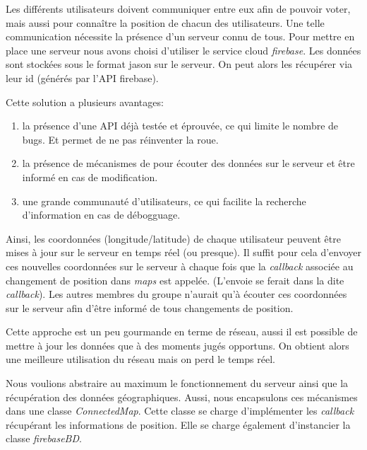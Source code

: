 Les différents utilisateurs doivent communiquer entre eux afin de pouvoir voter, mais aussi pour connaître la position de chacun
des utilisateurs. Une telle communication nécessite la présence d'un serveur connu de tous. Pour mettre en place une serveur nous
avons choisi d'utiliser le service cloud \textit{firebase}. Les données sont stockées sous le format jason sur le serveur. On peut
alors les récupérer via leur id (générés par l'API firebase).
\newline

Cette solution a plusieurs avantages:
\begin{enumerate}
    \item la présence d'une API déjà testée et éprouvée, ce qui limite le nombre de bugs. Et permet de ne pas réinventer la roue.
    \item la présence de mécanismes de pour écouter des données sur le serveur et être informé en cas de modification.
    \item une grande communauté d'utilisateurs, ce qui facilite la recherche d'information en cas de débogguage.
\end{enumerate}

Ainsi, les coordonnées (longitude/latitude) de chaque utilisateur peuvent être mises à jour sur le serveur en temps réel (ou
presque). Il suffit pour cela d'envoyer ces nouvelles coordonnées sur le serveur à chaque fois que la \textit{callback} associée
au changement de position dans \textit{maps} est appelée. (L'envoie se ferait dans la dite \textit{callback}). Les autres membres
du groupe n'aurait qu'à écouter ces coordonnées sur le serveur afin d'être informé de tous changements de position.
\newline

Cette approche est un peu gourmande en terme de réseau, aussi il est possible de mettre à jour les données que à des moments jugés
opportuns. On obtient alors une meilleure utilisation du réseau mais on perd le temps réel.
\newline

Nous voulions abstraire au maximum le fonctionnement du serveur ainsi que la récupération des données géographiques. Aussi, nous
encapsulons ces mécanismes dans une classe \textit{ConnectedMap}. Cette classe se charge d'implémenter les \textit{callback}
récupérant les informations de position. Elle se charge également d'instancier la classe \textit{firebaseBD}.
\newline

